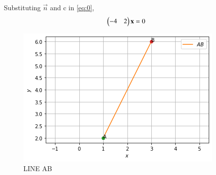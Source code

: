 \documentclass[journal,12pt,twocolumn]{IEEEtran}
\begin{document}
Substituting $\vec{n}$ and c in \eqref{eq:0},
\begin{align}
    \begin{pmatrix}-4&2\end{pmatrix} \mathbf{x}=0 
\end{align}
\begin{figure}[!h]
\centering
\includegraphics[width=\columnwidth]{fig5.png}
\caption{LINE AB}
\label{fig:1}
\end{figure}
\end{document}
